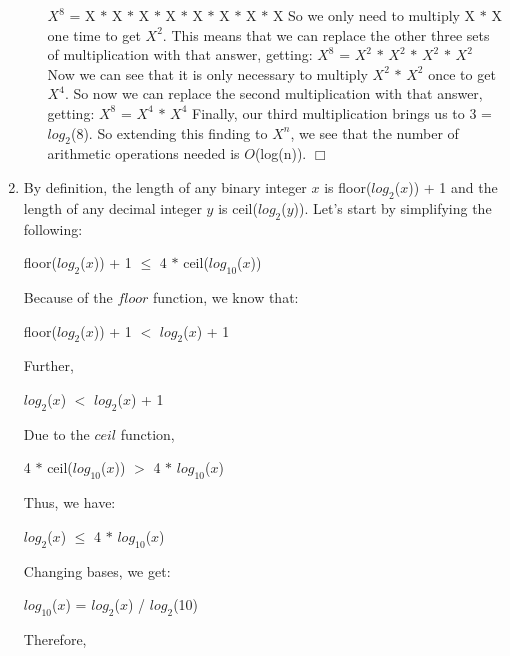 \documentclass[12pt,letterpaper]{article}
\begin{document}
\begin{enumerate}
\begin{enumerate}
        $X^8$ = X $\ast$ X $\ast$ X $\ast$ X $\ast$ X $\ast$ X $\ast$ X $\ast$ X
        \newline
        So we only need to multiply X $\ast$ X one time to get $X^2$. This means 		 that we can replace the other three sets of multiplication with that 			answer, getting:
        \newline
        $X^8$ = $X^2$ $\ast$ $X^2$ $\ast$ $X^2$ $\ast$ $X^2$
        \newline
        Now we can see that it is only necessary to multiply $X^2$ $\ast$ $X^2$ 		once to get $X^4$. So now we can replace the second multiplication with 		that answer, getting:
        \newline
        $X^8$ = $X^4$ $\ast$ $X^4$
        \newline
        Finally, our third multiplication brings us to 3 = $log_2$(8). So 				extending this finding to $X^n$, we see that the number of arithmetic 			operations needed is \(O\)(log(n)). $\Box$
      \end{enumerate}
    \item
      By definition, the length of any binary integer \(x\) is 				 		  floor($log_2$(\(x\))) + 1 and the length of any decimal integer \(y\) 		  is ceil($log_2$(\(y\))). Let's start by simplifying the following:
      \begin{center}
      floor($log_2$(\(x\))) + 1 \(\leq\) 4 $\ast$ ceil($log_{10}$(\(x\)))
      \end{center}
      Because of the $floor$ function, we know that:
      \begin{center}
      floor($log_2$(\(x\))) + 1 $<$ $log_2$(\(x\)) + 1
      \end{center}
      Further,
      \begin{center}
      $log_2$(\(x\)) $<$ $log_2$(\(x\)) + 1
      \end{center}
      Due to the $ceil$ function,
      \begin{center}
      4 $\ast$ ceil($log_{10}$(\(x\))) $>$ 4 $\ast$ $log_{10}$(\(x\))
      \end{center}
      Thus, we have:
      \begin{center}
      $log_2$(\(x\)) \(\leq\) 4 $\ast$ $log_{10}$(\(x\))
      \end{center}
      Changing bases, we get:
      \begin{center}
  	  $log_{10}$(\(x\)) = $log_2$(\(x\)) / $log_2$(10)
      \end{center}
      Therefore,
      \begin{center}

\end{center}
\end{enumerate}
\end{document}
